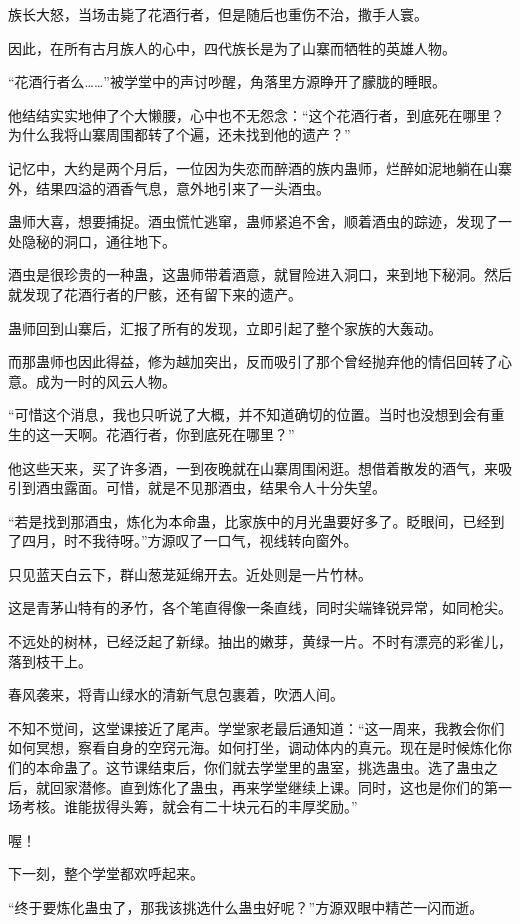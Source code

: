 \begin{this_body}
族长大怒，当场击毙了花酒行者，但是随后也重伤不治，撒手人寰。

因此，在所有古月族人的心中，四代族长是为了山寨而牺牲的英雄人物。

“花酒行者么……”被学堂中的声讨吵醒，角落里方源睁开了朦胧的睡眼。

他结结实实地伸了个大懒腰，心中也不无怨念：“这个花酒行者，到底死在哪里？为什么我将山寨周围都转了个遍，还未找到他的遗产？”

记忆中，大约是两个月后，一位因为失恋而醉酒的族内蛊师，烂醉如泥地躺在山寨外，结果四溢的酒香气息，意外地引来了一头酒虫。

蛊师大喜，想要捕捉。酒虫慌忙逃窜，蛊师紧追不舍，顺着酒虫的踪迹，发现了一处隐秘的洞口，通往地下。

酒虫是很珍贵的一种蛊，这蛊师带着酒意，就冒险进入洞口，来到地下秘洞。然后就发现了花酒行者的尸骸，还有留下来的遗产。

蛊师回到山寨后，汇报了所有的发现，立即引起了整个家族的大轰动。

而那蛊师也因此得益，修为越加突出，反而吸引了那个曾经抛弃他的情侣回转了心意。成为一时的风云人物。

“可惜这个消息，我也只听说了大概，并不知道确切的位置。当时也没想到会有重生的这一天啊。花酒行者，你到底死在哪里？”

他这些天来，买了许多酒，一到夜晚就在山寨周围闲逛。想借着散发的酒气，来吸引到酒虫露面。可惜，就是不见那酒虫，结果令人十分失望。

“若是找到那酒虫，炼化为本命蛊，比家族中的月光蛊要好多了。眨眼间，已经到了四月，时不我待呀。”方源叹了一口气，视线转向窗外。

只见蓝天白云下，群山葱茏延绵开去。近处则是一片竹林。

这是青茅山特有的矛竹，各个笔直得像一条直线，同时尖端锋锐异常，如同枪尖。

不远处的树林，已经泛起了新绿。抽出的嫩芽，黄绿一片。不时有漂亮的彩雀儿，落到枝干上。

春风袭来，将青山绿水的清新气息包裹着，吹洒人间。

不知不觉间，这堂课接近了尾声。学堂家老最后通知道：“这一周来，我教会你们如何冥想，察看自身的空窍元海。如何打坐，调动体内的真元。现在是时候炼化你们的本命蛊了。这节课结束后，你们就去学堂里的蛊室，挑选蛊虫。选了蛊虫之后，就回家潜修。直到炼化了蛊虫，再来学堂继续上课。同时，这也是你们的第一场考核。谁能拔得头筹，就会有二十块元石的丰厚奖励。”

喔！

下一刻，整个学堂都欢呼起来。

“终于要炼化蛊虫了，那我该挑选什么蛊虫好呢？”方源双眼中精芒一闪而逝。

\end{this_body}

